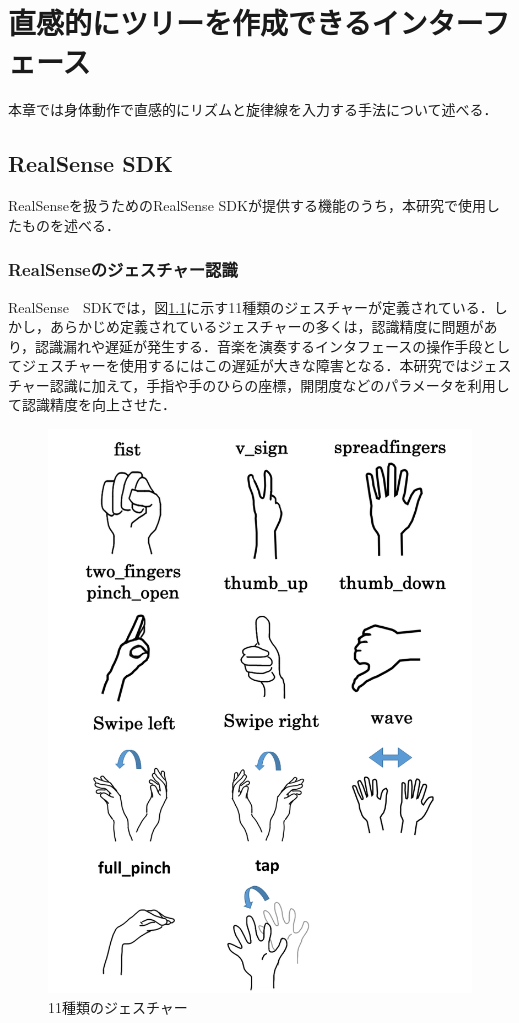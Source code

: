 \chapter{直感的にツリーを作成できるインターフェース}
本章では身体動作で直感的にリズムと旋律線を入力する手法について述べる．

\section{RealSense SDK}
RealSenseを扱うためのRealSense SDKが提供する機能のうち，本研究で使用したものを述べる．
\subsection{RealSenseのジェスチャー認識}
RealSense　SDKでは，図\ref{img:jesture}に示す11種類のジェスチャーが定義されている．しかし，あらかじめ定義されているジェスチャーの多くは，認識精度に問題があり，認識漏れや遅延が発生する．音楽を演奏するインタフェースの操作手段としてジェスチャーを使用するにはこの遅延が大きな障害となる．本研究ではジェスチャー認識に加えて，手指や手のひらの座標，開閉度などのパラメータを利用して認識精度を向上させた．
\begin{figure}[t]
	\begin{center}
		\includegraphics[width=0.9\linewidth]{assets/img/jesture.png}
		\caption{11種類のジェスチャー}
		\label{img:jesture}
	\end{center}
\end{figure}

